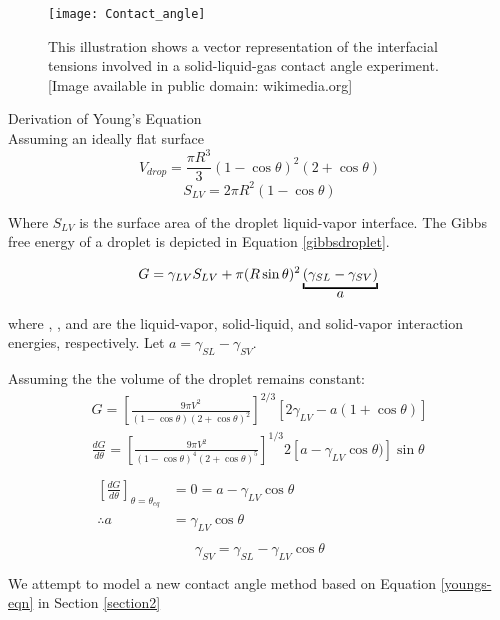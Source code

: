 \begin{figure}
	\centering
	\texttt{[image: Contact\_angle]}
	\caption{This illustration shows a vector representation of the interfacial tensions involved in a solid-liquid-gas contact angle experiment. [Image available in public domain: wikimedia.org]}
	\label{fig:ca-vector}
\end{figure}

\begin{tcolorbox}
Derivation of Young's Equation\\
Assuming an ideally flat surface
\begin{equation} \label{dropvol}
V_{drop} = \frac{\pi R^{3}}{3} (1-\cos\theta)^{2} (2+\cos\theta)
\end{equation}
\begin{equation} \label{liqvapSA}
S_{LV} = 2\pi R^{2} (1-\cos\theta)
\end{equation}

Where $S_{LV}$ is the surface area of the droplet liquid-vapor interface. The Gibbs free energy of a droplet is depicted in Equation \ref{gibbsdroplet}.

\begin{equation} \label{gibbsdroplet}
G = \gamma_{LV} S_{LV} + \pi(R \sin\theta)^{2} \underbracket{(\gamma_{SL}-\gamma_{SV})}_{\text{\normalsize{$a$}}}\\
\end{equation}

where \gamLV, \gamSL, and \gamSV are the liquid-vapor, solid-liquid, and solid-vapor interaction energies, respectively. Let $a = \gamma_{SL}-\gamma_{SV}$. 

Assuming the the volume of the droplet remains constant:
\begin{equation*}
\begin{gathered}
G = \left[\frac{9\pi V^{2}}{(1-\cos\theta)(2+\cos\theta)^{2}}\right]^{2/3}
\left[2\gamma_{LV} - a(1+\cos\theta)\right]\\
\frac{dG}{d\theta} = \left[\frac{9\pi V^{2}}{(1-\cos\theta)^{4}(2+\cos\theta)^{5}}\right]^{1/3}
2\left[a-\gamma_{LV}\cos\theta)\right]\sin\theta\\ \\
\begin{split}
\left[\frac{dG}{d\theta}\right]_{\theta=\theta_{eq}}&=0=a-\gamma_{LV}\cos\theta\\
\therefore a 	&= \gamma_{LV}\cos\theta\\
\end{split}					
\end{gathered}
\end{equation*}
\begin{equation}\label{youngs-eqn}
\boxed{\gamma_{SV} =\gamma_{SL}-\gamma_{LV}\cos\theta}	
\end{equation}
\end{tcolorbox}
We attempt to model a new contact angle method based on Equation \ref{youngs-eqn} in Section \ref{section2}

